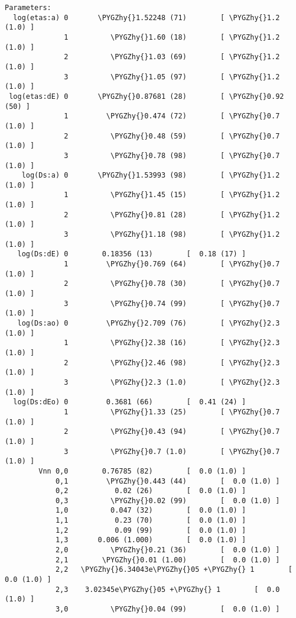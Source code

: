 \documentclass[letterpaper,10pt,english]{sphinxmanual}
\def\PYGZhy{\char`\-}
\begin{document}
\begin{itemize}
\begin{Verbatim}[commandchars=\\\{\}]
Parameters:
  log(etas:a) 0       \PYGZhy{}1.52248 (71)        [ \PYGZhy{}1.2 (1.0) ]  
              1          \PYGZhy{}1.60 (18)        [ \PYGZhy{}1.2 (1.0) ]  
              2          \PYGZhy{}1.03 (69)        [ \PYGZhy{}1.2 (1.0) ]  
              3          \PYGZhy{}1.05 (97)        [ \PYGZhy{}1.2 (1.0) ]  
 log(etas:dE) 0       \PYGZhy{}0.87681 (28)        [ \PYGZhy{}0.92 (50) ]  
              1         \PYGZhy{}0.474 (72)        [ \PYGZhy{}0.7 (1.0) ]  
              2          \PYGZhy{}0.48 (59)        [ \PYGZhy{}0.7 (1.0) ]  
              3          \PYGZhy{}0.78 (98)        [ \PYGZhy{}0.7 (1.0) ]  
    log(Ds:a) 0       \PYGZhy{}1.53993 (98)        [ \PYGZhy{}1.2 (1.0) ]  
              1          \PYGZhy{}1.45 (15)        [ \PYGZhy{}1.2 (1.0) ]  
              2          \PYGZhy{}0.81 (28)        [ \PYGZhy{}1.2 (1.0) ]  
              3          \PYGZhy{}1.18 (98)        [ \PYGZhy{}1.2 (1.0) ]  
   log(Ds:dE) 0        0.18356 (13)        [  0.18 (17) ]  
              1         \PYGZhy{}0.769 (64)        [ \PYGZhy{}0.7 (1.0) ]  
              2          \PYGZhy{}0.78 (30)        [ \PYGZhy{}0.7 (1.0) ]  
              3          \PYGZhy{}0.74 (99)        [ \PYGZhy{}0.7 (1.0) ]  
   log(Ds:ao) 0         \PYGZhy{}2.709 (76)        [ \PYGZhy{}2.3 (1.0) ]  
              1          \PYGZhy{}2.38 (16)        [ \PYGZhy{}2.3 (1.0) ]  
              2          \PYGZhy{}2.46 (98)        [ \PYGZhy{}2.3 (1.0) ]  
              3          \PYGZhy{}2.3 (1.0)        [ \PYGZhy{}2.3 (1.0) ]  
  log(Ds:dEo) 0         0.3681 (66)        [  0.41 (24) ]  
              1          \PYGZhy{}1.33 (25)        [ \PYGZhy{}0.7 (1.0) ]  
              2          \PYGZhy{}0.43 (94)        [ \PYGZhy{}0.7 (1.0) ]  
              3          \PYGZhy{}0.7 (1.0)        [ \PYGZhy{}0.7 (1.0) ]  
        Vnn 0,0        0.76785 (82)        [  0.0 (1.0) ]  
            0,1         \PYGZhy{}0.443 (44)        [  0.0 (1.0) ]  
            0,2           0.02 (26)        [  0.0 (1.0) ]  
            0,3          \PYGZhy{}0.02 (99)        [  0.0 (1.0) ]  
            1,0          0.047 (32)        [  0.0 (1.0) ]  
            1,1           0.23 (70)        [  0.0 (1.0) ]  
            1,2           0.09 (99)        [  0.0 (1.0) ]  
            1,3       0.006 (1.000)        [  0.0 (1.0) ]  
            2,0          \PYGZhy{}0.21 (36)        [  0.0 (1.0) ]  
            2,1        \PYGZhy{}0.01 (1.00)        [  0.0 (1.0) ]  
            2,2   \PYGZhy{}6.34043e\PYGZhy{}05 +\PYGZhy{} 1        [  0.0 (1.0) ]  
            2,3    3.02345e\PYGZhy{}05 +\PYGZhy{} 1        [  0.0 (1.0) ]  
            3,0          \PYGZhy{}0.04 (99)        [  0.0 (1.0) ]  

\end{Verbatim}
\end{itemize}
\end{document}

